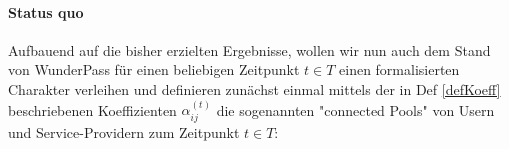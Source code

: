 
\paragraph{Status quo} 
\label{sec:eco_zahlen_zustand_wp_now}
\textrm{ }

\vspace{0.3cm}

Aufbauend auf die bisher erzielten Ergebnisse, wollen wir nun auch dem Stand von WunderPass für einen beliebigen Zeitpunkt $t \in T$ einen formalisierten Charakter verleihen und definieren zunächst einmal mittels der in Def \ref{defKoeff} beschriebenen Koeffizienten $\alpha^{(t)}_{ij}$ die sogenannten "connected Pools" von Usern und Service-Providern zum Zeitpunkt $t \in T$:

\vspace{0.3cm}

